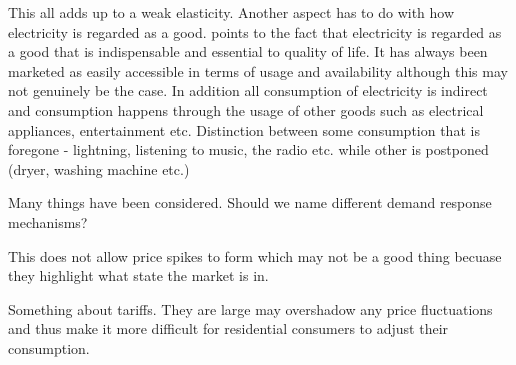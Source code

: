 This all adds up to a weak elasticity. Another aspect has to do with how electricity is regarded as a good. \citep{kirschen2003demand} points to the fact that electricity is regarded as a good that is indispensable and essential to quality of life. It has always been marketed as easily accessible in terms of usage and availability although this may not genuinely be the case. In addition all consumption of electricity is indirect and consumption happens through the usage of other goods such as electrical appliances, entertainment etc. Distinction between some consumption that is foregone - lightning, listening to music, the radio etc. while other is postponed (dryer, washing machine etc.) 

Many things have been considered. Should we name different demand response mechanisms? 

This does not allow price spikes to form which may not be a good thing becuase they highlight what state the market is in. 

Something about tariffs. They are large may overshadow any price fluctuations and thus make it more difficult for residential consumers to adjust their consumption. 

\citep{kirschen2003demand}
 



